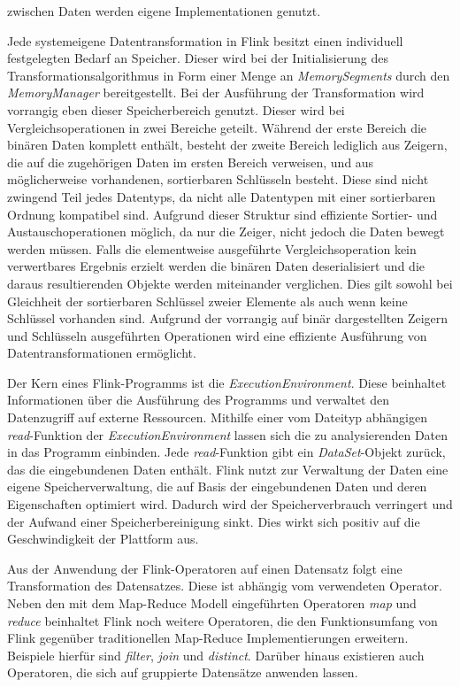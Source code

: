 zwischen Daten werden eigene Implementationen genutzt. \cite{Hueske2015}

Jede systemeigene Datentransformation in Flink besitzt einen individuell festgelegten Bedarf an Speicher. Dieser wird bei der Initialisierung des Transformationsalgorithmus in Form einer Menge an \textit{MemorySegments} durch den \textit{MemoryManager} bereitgestellt. Bei der Ausführung der Transformation wird vorrangig eben dieser Speicherbereich genutzt. Dieser wird bei Vergleichsoperationen in zwei Bereiche geteilt. Während der erste Bereich die binären Daten komplett enthält, besteht der zweite Bereich lediglich aus Zeigern, die auf die zugehörigen Daten im ersten Bereich verweisen, und aus möglicherweise vorhandenen, sortierbaren Schlüsseln besteht. Diese sind nicht zwingend Teil jedes Datentyps, da nicht alle Datentypen mit einer sortierbaren Ordnung kompatibel sind. Aufgrund dieser Struktur sind effiziente Sortier- und Austauschoperationen möglich, da nur die Zeiger, nicht jedoch die Daten bewegt werden müssen. Falls die elementweise ausgeführte Vergleichsoperation kein verwertbares Ergebnis erzielt werden die binären Daten deserialisiert und die daraus resultierenden Objekte werden miteinander verglichen. Dies gilt sowohl bei Gleichheit der sortierbaren Schlüssel zweier Elemente als auch wenn keine Schlüssel vorhanden sind. Aufgrund der vorrangig auf binär dargestellten Zeigern und Schlüsseln ausgeführten Operationen wird eine effiziente Ausführung von Datentransformationen ermöglicht. \cite{Hueske2015}

Der Kern eines Flink-Programms ist die \textit{ExecutionEnvironment}. Diese beinhaltet Informationen über die Ausführung des Programms und verwaltet den Datenzugriff auf externe Ressourcen. Mithilfe einer vom Dateityp abhängigen \textit{read}-Funktion der \textit{ExecutionEnvironment} lassen sich die zu analysierenden Daten in das Programm einbinden. Jede \textit{read}-Funktion gibt ein \textit{DataSet}-Objekt zurück, das die eingebundenen Daten enthält. Flink nutzt zur Verwaltung der Daten eine eigene Speicherverwaltung, die auf Basis der eingebundenen Daten und deren Eigenschaften optimiert wird. Dadurch wird der Speicherverbrauch verringert und der Aufwand einer Speicherbereinigung sinkt. Dies wirkt sich positiv auf die Geschwindigkeit der Plattform aus.

Aus der Anwendung der Flink-Operatoren auf einen Datensatz folgt eine Transformation des Datensatzes. Diese ist abhängig vom verwendeten Operator. Neben den mit dem Map-Reduce Modell eingeführten Operatoren \textit{map} und \textit{reduce} beinhaltet Flink noch weitere Operatoren, die den Funktionsumfang von Flink gegenüber traditionellen Map-Reduce Implementierungen erweitern. Beispiele hierfür sind \textit{filter}, \textit{join} und \textit{distinct}. Darüber hinaus existieren auch Operatoren, die sich auf gruppierte Datensätze anwenden lassen.

